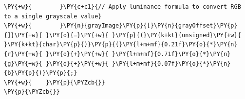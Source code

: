 \begin{Verbatim}[label=\makebox{\url{https://github.com/lucabaldini/cmepda/tree/master/slides/latex/snippets/cuda_rgb_to_grayscale.cu}},commandchars=\\\{\}]
\PY{+w}{        }\PY{c+c1}{// Apply luminance formula to convert RGB to a single grayscale value}
\PY{+w}{        }\PY{n}{grayImage}\PY{p}{[}\PY{n}{grayOffset}\PY{p}{]}\PY{+w}{ }\PY{o}{=}\PY{+w}{ }\PY{p}{(}\PY{k+kt}{unsigned}\PY{+w}{ }\PY{k+kt}{char}\PY{p}{)}\PY{p}{(}\PY{l+m+mf}{0.21f}\PY{o}{*}\PY{n}{r}\PY{+w}{ }\PY{o}{+}\PY{+w}{ }\PY{l+m+mf}{0.71f}\PY{o}{*}\PY{n}{g}\PY{+w}{ }\PY{o}{+}\PY{+w}{ }\PY{l+m+mf}{0.07f}\PY{o}{*}\PY{n}{b}\PY{p}{)}\PY{p}{;}
\PY{+w}{    }\PY{p}{\PYZcb{}}
\PY{p}{\PYZcb{}}
\end{Verbatim}